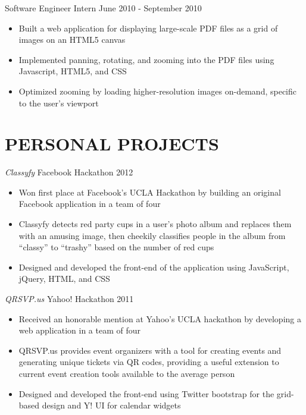 \documentclass{res}
\begin{document}
\begin{resume}
 Software Engineer Intern \hfill    June 2010 - September 2010

   \begin{itemize} \itemsep -2pt
   \item Built a web application for displaying large-scale PDF files as a grid of images on an HTML5 canvas
   \item Implemented panning, rotating, and zooming into the PDF files using Javascript, HTML5, and CSS
	\item Optimized zooming by loading higher-resolution images on-demand, specific to the user's viewport
   \end{itemize} \vspace{-6pt}

\section{PERSONAL PROJECTS}
\vspace{8pt}

 {\sl Classyfy} \hfill Facebook Hackathon 2012
   \begin{itemize} \itemsep -2pt
   \item{Won first place at Facebook's UCLA Hackathon by building an original Facebook application in a team of four}
   \item Classyfy detects red party cups in a user's photo album and replaces them with an amusing image, then cheekily classifies people in the album from ``classy'' to ``trashy'' based on the number of red cups
    \item Designed and developed the front-end of the application using JavaScript, jQuery,  HTML, and CSS
    \end{itemize} \vspace{-6pt}

 {\sl QRSVP.us} \hfill Yahoo! Hackathon 2011
  \begin{itemize} \itemsep -2pt
  \item Received an honorable mention at Yahoo's UCLA hackathon by developing a web application in a team of four
  \item QRSVP.us provides event organizers with a tool for creating events and generating unique tickets via QR codes, providing a useful extension to current event creation tools available to the average person
  \item Designed and developed the front-end using Twitter bootstrap for the grid-based design and Y! UI for calendar widgets
  \end{itemize} \vspace{-6pt}


\end{resume}
\end{document}
